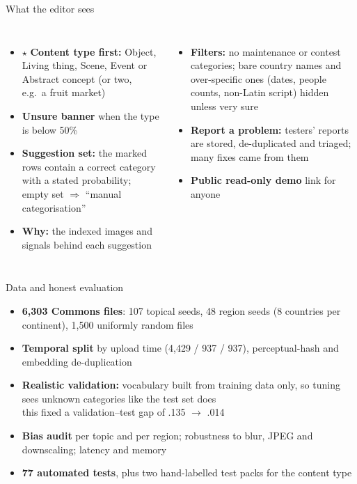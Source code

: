 \documentclass[aspectratio=169,11pt]{beamer}
\begin{document}
\begin{frame}{What the editor sees}
\begin{columns}[T]
\begin{itemize}\setlength{\itemsep}{5pt}
\item {\color{accent}$\star$} \textbf{Content type first:} Object, Living thing, Scene, Event or Abstract concept (or two, e.g.\ a fruit market)
\item \textbf{Unsure banner} when the type is below 50\%
\item {\color{good}\checkmark} \textbf{Suggestion set:} the marked rows contain a correct category with a stated probability; empty set $\Rightarrow$ ``manual categorisation''
\item \textbf{Why:} the indexed images and signals behind each suggestion
\end{itemize}
\begin{itemize}\setlength{\itemsep}{5pt}
\item \textbf{Filters:} no maintenance or contest categories; bare country names and over-specific ones (dates, people counts, non-Latin script) hidden unless very sure
\item \textbf{Report a problem:} testers' reports are stored, de-duplicated and triaged; many fixes came from them
\item \textbf{Public read-only demo} link for anyone
\end{itemize}
\end{columns}
\end{frame}

\begin{frame}{Data and honest evaluation}
\begin{itemize}\setlength{\itemsep}{6pt}
\item \textbf{6,303 Commons files}: 107 topical seeds, 48 region seeds (8 countries per continent), 1,500 uniformly random files
\item \textbf{Temporal split} by upload time (4,429 / 937 / 937), perceptual-hash and embedding de-duplication
\item \textbf{Realistic validation:} vocabulary built from training data only, so tuning sees unknown categories like the test set does \\
{\small\color{muted} this fixed a validation--test gap of .135 $\rightarrow$ .014}
\item \textbf{Bias audit} per topic and per region; robustness to blur, JPEG and downscaling; latency and memory
\item \textbf{77 automated tests}, plus two hand-labelled test packs for the content type
\end{itemize}
\end{frame}
\end{document}

